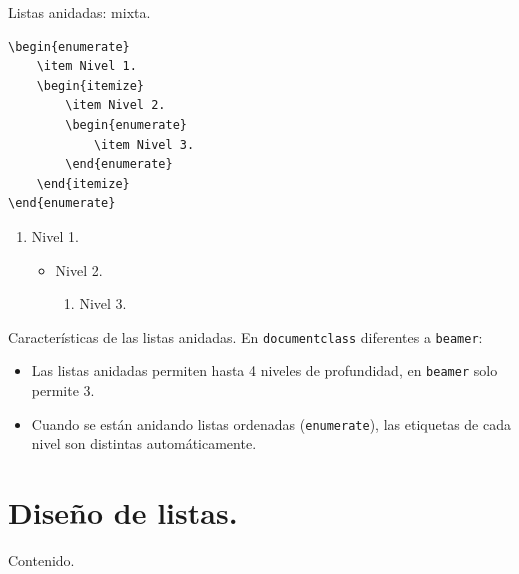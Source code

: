 \documentclass[dvipsnames,xcolor, handout]{beamer}
\theoremstyle{plain}
\theoremstyle{definition}
\begin{document}
\begin{frame}[fragile]{Listas anidadas: mixta.}
\begin{minipage}{0.55\linewidth}
\begin{verbatim}
\begin{enumerate}
    \item Nivel 1.
    \begin{itemize}
        \item Nivel 2.
        \begin{enumerate}
            \item Nivel 3.
        \end{enumerate}
    \end{itemize}
\end{enumerate}    
\end{verbatim}
    \end{minipage}\pause
    \begin{minipage}{0.45\linewidth}
\begin{enumerate}
    \item Nivel 1.
    \begin{itemize}
        \item Nivel 2.
        \begin{enumerate}
            \item Nivel 3.
        \end{enumerate}
    \end{itemize}
\end{enumerate}    
\end{minipage}
\end{frame}

\begin{frame}[fragile]{Características de las listas anidadas.}
En \verb!documentclass! diferentes a \verb!beamer!:

\begin{itemize}
    \item Las listas anidadas permiten hasta 4 niveles de profundidad, en \verb!beamer! solo permite 3. 
    \item Cuando se están anidando listas ordenadas (\verb!enumerate!), las etiquetas de cada nivel son distintas automáticamente.
\end{itemize}
\end{frame}

\section{Diseño de listas.}
\begin{frame}{Contenido.}
  \tableofcontents[currentsection]
\end{frame}
\end{document}
